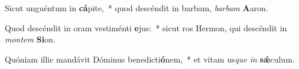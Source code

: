 \item Sicut unguéntum in \textbf{cá}pite,~* quod descéndit in barbam, \textit{bar}\textit{bam} \textbf{A}aron.
\item Quod descéndit in oram vestiménti \textbf{e}jus:~* sicut ros Hermon, qui descéndit in \textit{mon}\textit{tem} \textbf{Si}on.
\item Quóniam illic mandávit Dóminus benedicti\textbf{ó}nem,~* et vitam us\textit{que} \textit{in} \textbf{sǽ}culum.
